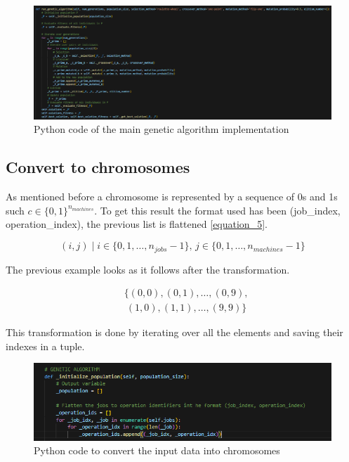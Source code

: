 \documentclass[11pt, a4paper]{article}
\begin{document}
\begin{figure}[H]
    \centering
    \includegraphics[width=\textwidth]{media/genetic_algorithm.png}
    \caption{Python code of the main genetic algorithm implementation}
    \label{fig:image_1}
\end{figure}

\subsection{Convert to chromosomes}

As mentioned before a chromosome is represented by a sequence of 0s and 1s such \(c \in \{0, 1\}^{n_{machines}}\). To get this result the format used 
has been (job\_index, operation\_index), the previous list is flattened \eqref{equation_5}.

\begin{equation}
    (i, j) \mid i \in \{0, 1, \dots, n_{jobs}-1\}, \, j \in \{0, 1, \dots, n_{machines}-1\}
    \label{equation_5}
\end{equation}

\newpage

The previous example looks as it follows after the transformation.

\[
\begin{aligned}
&\{(0, 0), (0, 1), \dots, (0, 9), \\
&\ (1, 0), (1, 1), \dots, (9, 9)\}
\end{aligned}
\]

This transformation is done by iterating over all the elements and saving their indexes in a tuple.

\begin{figure}[H]
    \centering
    \includegraphics[width=\textwidth]{media/chromosomes_creation.png}
    \caption{Python code to convert the input data into chromosomes}
    \label{fig:image_8}
\end{figure}
\end{document}
